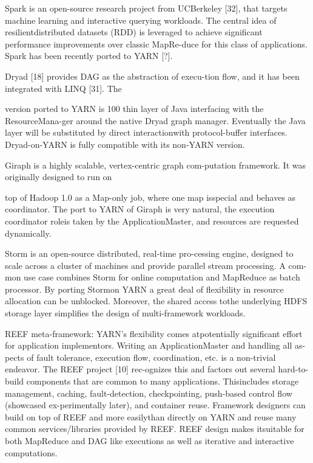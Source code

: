 Spark is an open-source research project from UCBerkeley [32], that targets machine learning and interactive querying workloads. The central idea of resilientdistributed datasets (RDD) is leveraged to achieve significant performance improvements over classic MapRe-duce for this class of applications. Spark has been recently ported to YARN [?].

Dryad [18] provides DAG as the abstraction of execu-tion flow, and it has been integrated with LINQ [31]. The

version ported to YARN is 100%
thin layer of Java interfacing with the ResourceMana-ger around the native Dryad graph manager. Eventually
the Java layer will be substituted by direct interactionwith protocol-buffer interfaces. Dryad-on-YARN is fully
compatible with its non-YARN version.

Giraph is a highly scalable, vertex-centric graph com-putation framework. It was originally designed to run on

top of Hadoop 1.0 as a Map-only job, where one map isspecial and behaves as coordinator. The port to YARN
of Giraph is very natural, the execution coordinator roleis taken by the ApplicationMaster, and resources are requested dynamically.

Storm is an open-source distributed, real-time pro-cessing engine, designed to scale across a cluster of machines and provide parallel stream processing. A com-mon use case combines Storm for online computation
and MapReduce as batch processor. By porting Stormon YARN a great deal of flexibility in resource allocation can be unblocked. Moreover, the shared access tothe underlying HDFS storage layer simplifies the design
of multi-framework workloads.

REEF meta-framework: YARN's flexibility comes atpotentially significant effort for application implementors. Writing an ApplicationMaster and handling all as-pects of fault tolerance, execution flow, coordination,
etc. is a non-trivial endeavor. The REEF project [10] rec-ognizes this and factors out several hard-to-build components that are common to many applications. Thisincludes storage management, caching, fault-detection,
checkpointing, push-based control flow (showcased ex-perimentally later), and container reuse. Framework designers can build on top of REEF and more easilythan directly on YARN and reuse many common services/libraries provided by REEF. REEF design makes itsuitable for both MapReduce and DAG like executions
as well as iterative and interactive computations.

